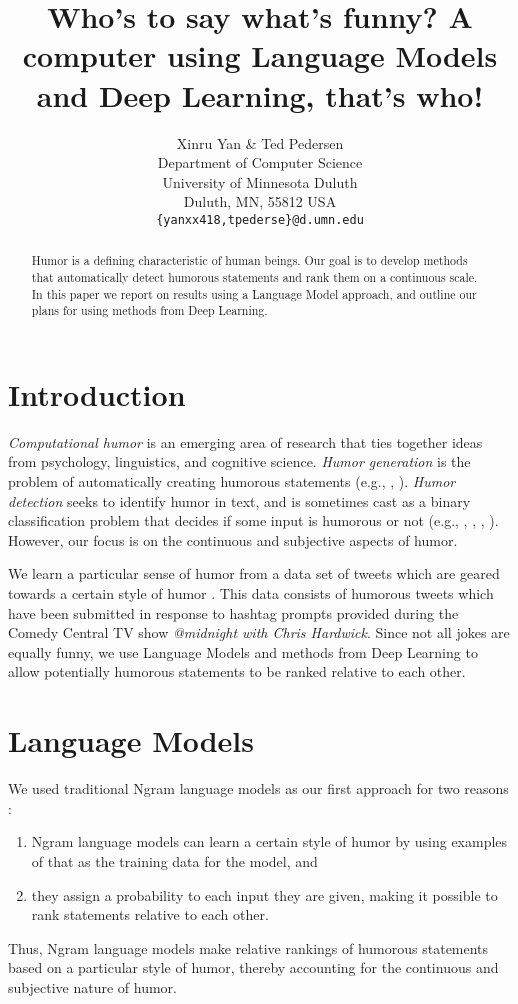 \documentclass[11pt,a4paper]{article}
\title{Who's to say what's funny? A computer using Language Models and Deep Learning, that's who!}
\author{Xinru Yan \& Ted Pedersen\\
  Department of Computer Science \\ University of Minnesota Duluth \\ Duluth, MN, 55812 USA \\
  {\tt \{yanxx418,tpederse\}@d.umn.edu}}
\date{}
\begin{document}
\maketitle
\begin{abstract}
Humor is a defining characteristic of human beings. 
Our goal is to develop methods that automatically 
detect humorous statements and rank them on a 
continuous scale. In this paper we report on results 
using a Language Model approach, and outline our
plans for using methods from Deep Learning.
\end{abstract}

\section{Introduction}
\textit{Computational humor} is an emerging area of 
research that ties together ideas from psychology, 
linguistics, and cognitive science. 
\textit{Humor generation} is the problem of automatically
creating humorous statements 
(e.g., \cite{StockS03}, \cite{ozbal2012computational}).
\textit{Humor detection} seeks to identify humor in text, 
and is sometimes cast as a binary classification problem that 
decides if some input is humorous or not 
(e.g., \cite{Learning:To:Laugh}, 
\cite{Recognizing:Humor:On:Twitter}, \cite{ShahafHM15},
\cite{MillerG15}). However, our focus is on  
the continuous and subjective aspects of humor. 

We learn a particular sense of humor from a data set of
tweets which are geared towards a certain style of humor
\cite{2016hashtagwars}. 
This data consists of humorous tweets which have been
submitted in response to hashtag prompts provided
during the Comedy
Central TV show \textit{@midnight with Chris Hardwick}.
Since not all jokes are equally funny, we use Language
Models and methods from Deep Learning to allow 
potentially humorous statements to be ranked relative to 
each other. 

\section{Language Models}

We used traditional Ngram language models as our first 
approach for two reasons : 
\begin{enumerate}
\item Ngram language models can learn a certain style of 
humor by using examples of that as the training data for the model, and
\item they assign a probability to each input they are given,
making it possible to rank statements relative to each other.  
\end{enumerate}
Thus, Ngram language models make relative rankings 
of humorous statements
based on a particular style of humor, thereby accounting for the 
continuous and subjective nature of humor. 
\end{document}
